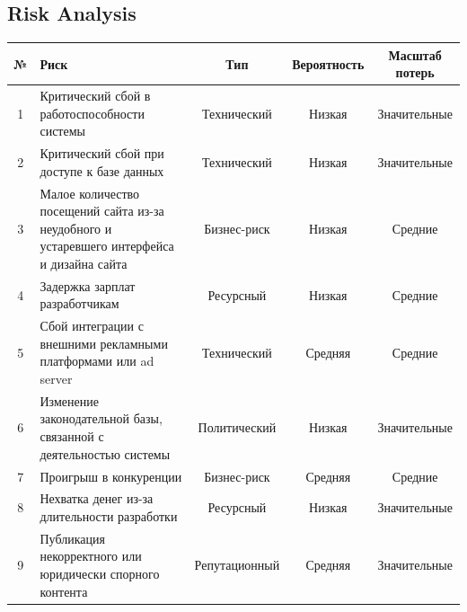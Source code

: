 \subsection{Risk Analysis}
\begin{center}
\renewcommand{\arraystretch}{1.4}
\begin{tabular}{|c|>{\raggedright\arraybackslash}p{5.8cm}|c|c|c|}
\hline
№ & Риск & Тип & Вероятность & Масштаб потерь \\ \hline
1 & Критический сбой в работоспособности системы & Технический & Низкая & Значительные \\ \hline
2 & Критический сбой при доступе к базе данных & Технический & Низкая & Значительные \\ \hline
3 & Малое количество посещений сайта из-за неудобного и устаревшего интерфейса и дизайна сайта & Бизнес-риск & Низкая & Средние \\ \hline
4 & Задержка зарплат разработчикам & Ресурсный & Низкая & Средние \\ \hline
5 & Сбой интеграции с внешними рекламными платформами или ad server & Технический & Средняя & Средние \\ \hline
6 & Изменение законодательной базы, связанной с деятельностью системы & Политический & Низкая & Значительные \\ \hline
7 & Проигрыш в конкуренции & Бизнес-риск & Средняя & Средние \\ \hline
8 & Нехватка денег из-за длительности разработки & Ресурсный & Низкая & Значительные \\ \hline
9 & Публикация некорректного или юридически спорного контента & Репутационный & Средняя & Значительные \\ \hline
\end{tabular}
\renewcommand{\arraystretch}{1}
\end{center}
